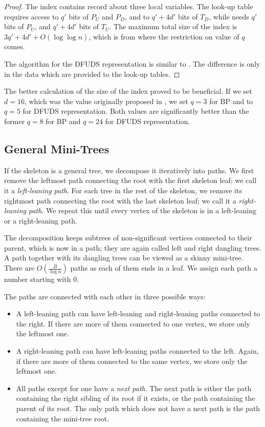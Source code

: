 \begin{proof}
	The index contains record about three local variables.
	The look-up table \dfudsSkinnyDown{} requires access to $q'$ bits of $P_U$ and $P_D$, and to $q' + 4d'$ bits of $T_D$, while \dfudsSkinnyDown{} needs $q'$ bits of $P_U$, and $q' + 4d'$ bits of $T_U$.
	The maximum total size of the index is $3q' + 4d' + O(\log \log n)$, which is from where the restriction on value of $q$ comes.	
	
	The algorithm \dfudsSubstringSkinny{} for the DFUDS representation is similar to \bpSubstringSkinny{}.
	The difference is only in the data which are provided to the look-up tables.
\end{proof}

The better calculation of the size of the index proved to be beneficial.
If we set $d = 16$, which was the value originally proposed in \cite{farzan2009universal}, we set $q = 3$ for BP and to $q = 5$ for DFUDS representation.
Both values are significantly better than the former $q = 8$ for BP and $q = 24$ for DFUDS representation.

\subsection{General Mini-Trees}

If the skeleton is a general tree, we decompose it iteratively into paths.
We first remove the leftmost path connecting the root with the first skeleton leaf; we call it a \emph{left-leaning path}.
For each tree in the rest of the skeleton, we remove its rightmost path connecting the root with the last skeleton leaf; we call it a \emph{right-leaning path}.
We repeat this until every vertex of the skeleton is in a left-leaning or a right-leaning path.

The decomposition keeps subtrees of non-significant vertices connected to their parent, which is now in a path; they are again called left and right dangling trees.
A path together with its dangling trees can be viewed as a skinny mini-tree.
There are $O(\frac{B}{\log n})$ paths as each of them ends in a leaf.
We assign each path a number starting with $0$.

The paths are connected with each other in three possible ways:
\begin{itemize}
	\item A left-leaning path can have left-leaning and right-leaning paths connected to the right.
	If there are more of them connected to one vertex, we store only the leftmost one.
	
	\item A right-leaning path can have left-leaning paths connected to the left.
	Again, if there are more of them connected to the same vertex, we store only the leftmost one.
	
	\item All paths except for one have a \emph{next path}.
	The next path is either the path containing the right sibling of its root if it exists, or the path containing the parent of its root.
	The only path which does not have a next path is the path containing the mini-tree root.
\end{itemize}

